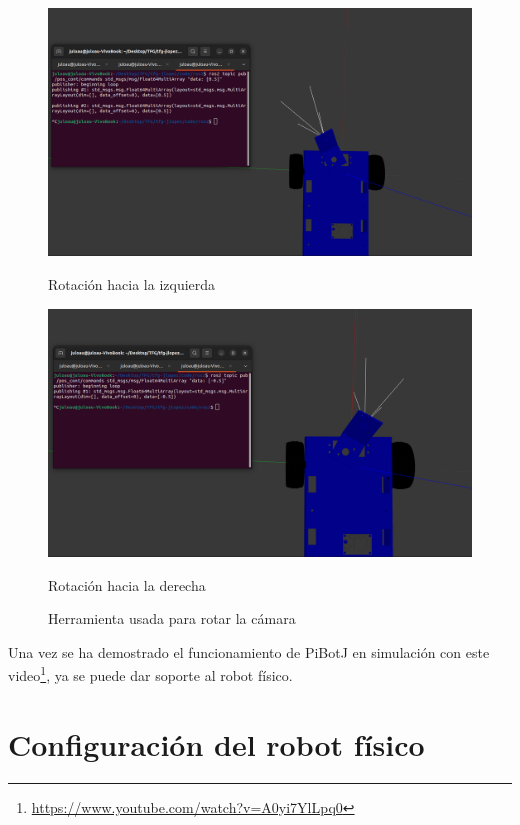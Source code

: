 \begin{figure}[ht!]
	\centering
	\begin{minipage}{0.45\linewidth}
		\centering
		\includegraphics[width=\linewidth]{figs/cap6/rotizq.png}
		\caption*{\centering Rotación hacia la izquierda} 
	\end{minipage}
	\hspace{0.25cm}
	\begin{minipage}{0.45\linewidth}
		\centering
		\includegraphics[width=\linewidth]{figs/cap6/rotder.png}
		\caption*{\centering Rotación hacia la derecha} 
	\end{minipage}
	\caption{Herramienta usada para rotar la cámara}
	\label{fig:camararot}
\end{figure}


Una vez se ha demostrado el funcionamiento de PiBotJ en simulación con este video\footnote{\url{https://www.youtube.com/watch?v=A0yi7YlLpq0}}, ya se puede dar soporte al robot físico.

\section{Configuración del robot físico}
\label{sec:robotfisico}

